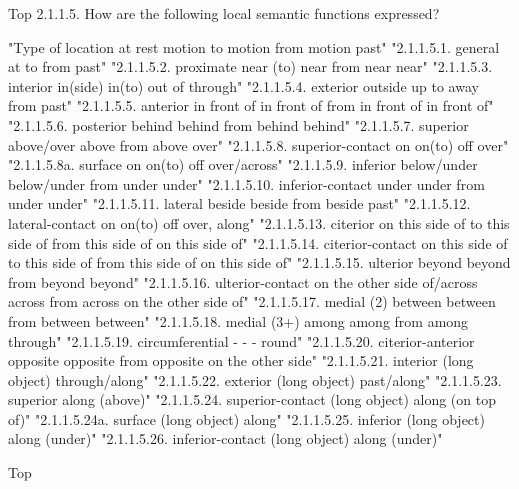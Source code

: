 Top
2.1.1.5. How are the following local semantic functions expressed?

"Type of location 	at rest 	motion to 	motion from 	motion past"
"2.1.1.5.1. 	general 	at 	to 	from 	past"
"2.1.1.5.2. 	proximate 	near (to) 	near 	from near 	near"
"2.1.1.5.3. 	interior 	in(side) 	in(to) 	out of 	through"
"2.1.1.5.4. 	exterior 	outside 	up to 	away from 	past"
"2.1.1.5.5. 	anterior 	in front of 	in front of 	from in front of 	in front of"
"2.1.1.5.6. 	posterior 	behind 	behind 	from behind 	behind"
"2.1.1.5.7. 	superior 	above/over 	above 	from above 	over"
"2.1.1.5.8. 	superior-contact 	on 	on(to) 	off 	over"
"2.1.1.5.8a. 	surface 	on 	on(to) 	off 	over/across"
"2.1.1.5.9. 	inferior 	below/under 	below/under 	from under 	under"
"2.1.1.5.10. 	inferior-contact 	under 	under 	from under 	under"
"2.1.1.5.11. 	lateral 	beside 	beside 	from beside 	past"
"2.1.1.5.12. 	lateral-contact 	on 	on(to) 	off 	over, along"
"2.1.1.5.13. 	citerior 	on this side of 	to this side of 	from this side of 	on this side of"
"2.1.1.5.14. 	citerior-contact 	on this side of 	to this side of 	from this side of 	on this side of"
"2.1.1.5.15. 	ulterior 	beyond 	beyond 	from beyond 	beyond"
"2.1.1.5.16. 	ulterior-contact 	on the other side of/across 	across 	from across 	on the other side of"
"2.1.1.5.17. 	medial (2) 	between 	between 	from between 	between"
"2.1.1.5.18. 	medial (3+) 	among 	among 	from among 	through"
"2.1.1.5.19. 	circumferential 	- 	- 	- 	round"
"2.1.1.5.20. 	citerior-anterior 	opposite 	opposite 	from opposite 	on the other side"
"2.1.1.5.21. 	interior (long object) 	  	  	  	through/along"
"2.1.1.5.22. 	exterior (long object) 	  	  	  	past/along"
"2.1.1.5.23. 	superior 	  	  	  	along (above)"
"2.1.1.5.24. 	superior-contact (long object) 	  	  	  	along (on top of)"
"2.1.1.5.24a. 	surface (long object) 	  	  	  	along"
"2.1.1.5.25. 	inferior (long object) 	  	  	  	along (under)"
"2.1.1.5.26. 	inferior-contact (long object) 	  	  	  	along (under)"



Top

